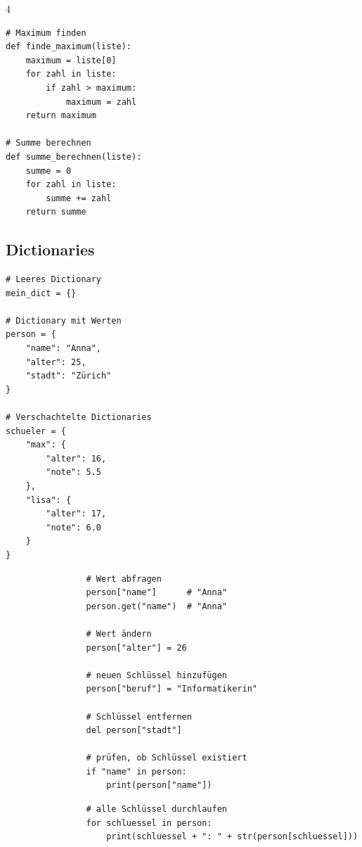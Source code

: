 \begin{landscape}
\begin{multicols*}{4}
		\begin{cheatSheetBox}[title=Algorithmen mit Listen]
			\begin{lstlisting}
# Maximum finden
def finde_maximum(liste):
    maximum = liste[0]
    for zahl in liste:
        if zahl > maximum:
            maximum = zahl
    return maximum

# Summe berechnen
def summe_berechnen(liste):
    summe = 0
    for zahl in liste:
        summe += zahl
    return summe
\end{lstlisting}
		\end{cheatSheetBox}

		\columnbreak\textcolor{\cheatSheetColor}{\subsection*{Dictionaries}}

		\begin{cheatSheetBox}[title=Dictionary erstellen]
			\begin{lstlisting}
# Leeres Dictionary
mein_dict = {}

# Dictionary mit Werten
person = {
    "name": "Anna",
    "alter": 25,
    "stadt": "Zürich"
}

# Verschachtelte Dictionaries
schueler = {
    "max": {
        "alter": 16,
        "note": 5.5
    },
    "lisa": {
        "alter": 17,
        "note": 6.0
    }
}
\end{lstlisting}
		\end{cheatSheetBox}

		\begin{cheatSheetBox}[title=Auf Dictionary zugreifen]
			\begin{lstlisting}
				# Wert abfragen
				person["name"]      # "Anna"
				person.get("name")  # "Anna"

				# Wert ändern
				person["alter"] = 26

				# neuen Schlüssel hinzufügen
				person["beruf"] = "Informatikerin"

				# Schlüssel entfernen
				del person["stadt"]

				# prüfen, ob Schlüssel existiert
				if "name" in person:
					print(person["name"])
			\end{lstlisting}
		\end{cheatSheetBox}

		\begin{cheatSheetBox}[title=Dictionary durchlaufen]
			\begin{lstlisting}
				# alle Schlüssel durchlaufen
				for schluessel in person:
					print(schluessel + ": " + str(person[schluessel]))


\end{lstlisting}
\end{cheatSheetBox}
\end{multicols*}
\end{landscape}
